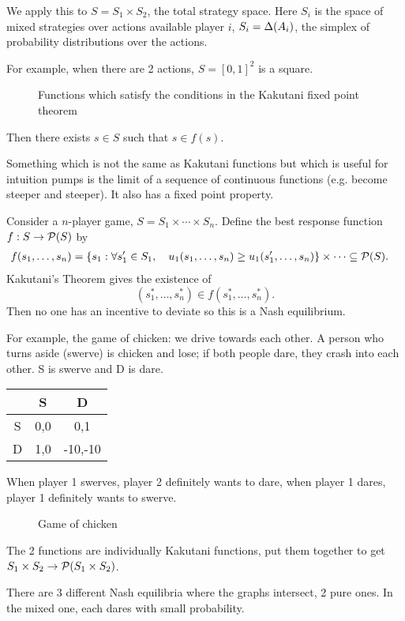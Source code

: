\documentclass[11pt]{article}
\begin{document}
We apply this to $S=S_1\times S_2$, the total strategy space. Here $S_i$ is the space of mixed strategies over actions available player $i$, $S_i = \Delta (A_i)$, the simplex of probability distributions over the actions.

For example, when there are 2 actions, $S=[0,1]^2$ is a square.

\begin{figure}
\caption{Functions which satisfy the conditions in the Kakutani fixed point theorem}
\end{figure}

Then there exists $s\in S$ such that $s\in f(s)$.

Something which is not the same as Kakutani functions but which is useful for intuition pumps is the limit of a sequence of continuous functions (e.g. become steeper and steeper). It also has a fixed point property.

Consider a $n$-player game, $S=S_1\times \cdots \times S_n$. Define the best response function $f:S\to \mathcal{P}(S)$ by
\begin{align}
f(s_1,\ldots, s_n) &= 
\left\{{s_1}:{\forall s_1'\in S_1,\quad u_1(s_1,\ldots, s_n)\ge u_1(s_1',\ldots, s_n)}\right\}\times \cdots \subseteq \mathcal{P}(S).
\end{align}
Kakutani's Theorem gives the existence of
$$
(s_1^*,\ldots, s_n^*)\in f(s_1^*,\ldots, s_n^*).$$ 
Then no one has an incentive to deviate so this is a Nash equilibrium.

For example, the game of chicken: we drive towards each other. A person who turns aside (swerve) is chicken and lose; if both people dare, they crash into each other.
S is swerve and D is dare.

\begin{center}
\begin{tabular}{c|c|c|}
& S & D\tabularnewline
\hline
S& 0,0 & 0,1\tabularnewline
\hline
D&1,0 &-10,-10\tabularnewline
\hline
\end{tabular}
\end{center}

When player 1 swerves, player 2 definitely wants to dare, when player 1 dares, player 1 definitely wants to swerve.

\begin{figure}
\caption{Game of chicken}
\end{figure}

The 2 functions are individually Kakutani functions, put them together to get $S_1\times S_2\to \mathcal{P}(S_1\times S_2)$. 

There are 3 different Nash equilibria where the graphs intersect, 2 pure ones. In the mixed one, each dares with small probability.


\end{document}
